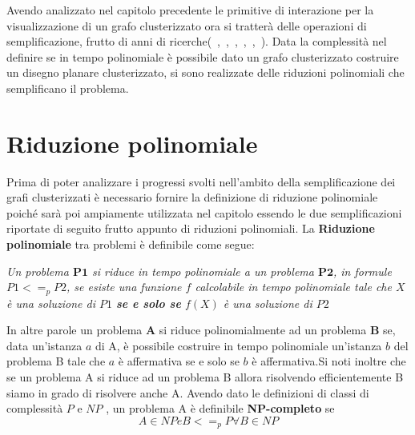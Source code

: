 \large{
Avendo analizzato nel capitolo precedente le primitive di interazione per la visualizzazione di un grafo clusterizzato ora si tratterà delle operazioni di semplificazione, frutto di anni di ricerche(~\cite{10.1007/978-3-642-11805-0_8},~\cite{DBLP:journals/corr/abs-1808-07437},~\cite{pipe2018},~\cite{angelini_et_al:LIPIcs:2016:6781},~\cite{10.1093/comjnl/bxw035},~\cite{10.1007/3-540-45848-4_5}). Data la complessità nel definire se in tempo polinomiale è possibile dato un grafo clusterizzato costruire un disegno planare clusterizzato, si sono realizzate delle riduzioni polinomiali che semplificano il problema.
\section{Riduzione polinomiale}
Prima di poter analizzare i progressi svolti nell'ambito della semplificazione dei grafi clusterizzati è necessario fornire la definizione di riduzione polinomiale poiché sarà poi ampiamente utilizzata nel capitolo essendo le due semplificazioni riportate di seguito frutto appunto di riduzioni polinomiali.
La \textbf{Riduzione polinomiale} tra problemi è definibile come segue:\\
\newline
\begin{center}
	\textit{Un problema $\textbf{P1}$ si riduce in tempo polinomiale a un problema $\textbf{P2}$, in formule $P1<=_pP2$, se esiste una funzione $f$ calcolabile in tempo polinomiale tale che $X$ è una soluzione di $P1$ \textbf{se e solo se} $f(X)$ è una soluzione di $P2$}
\end{center}
In altre parole un problema \textbf{A} si riduce polinomialmente ad un problema \textbf{B} se, data un’istanza $a$ di A, è possibile costruire in tempo polinomiale un’istanza $b$ del problema B tale che $a$ è affermativa se e solo se $b$ è affermativa.Si noti inoltre che se un problema A si riduce ad un problema B allora risolvendo efficientemente B siamo in grado di risolvere anche A. Avendo dato le definizioni di classi di complessità $P$ e $NP$ , un problema A è definibile \textbf{NP-completo} se 
$$A \in NP e B<=_pP \forall B\in NP$$
 
}
